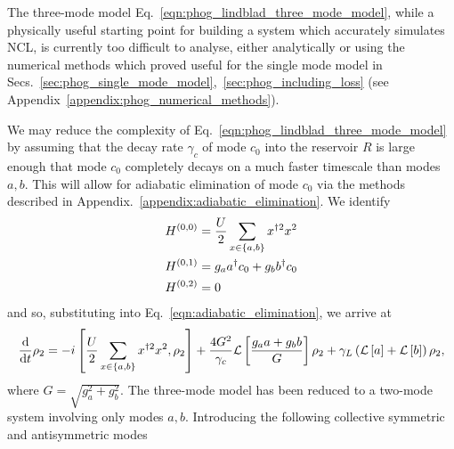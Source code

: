 The three-mode model Eq.~\ref{eqn:phog_lindblad_three_mode_model}, while a physically useful starting point for building a system which accurately simulates NCL, is currently too difficult to analyse, either analytically or using the numerical methods which proved useful for the single mode model in Secs.~\ref{sec:phog_single_mode_model},~\ref{sec:phog_including_loss} (see Appendix~\ref{appendix:phog_numerical_methods}). 

We may reduce the complexity of Eq.~\ref{eqn:phog_lindblad_three_mode_model} by assuming that the decay rate $\gamma_c$ of mode $c_0$ into the reservoir $R$ is large enough that mode $c_0$ completely decays on a much faster timescale than modes $a, b$. This will allow for adiabatic elimination of mode $c_0$ via the methods described in Appendix.~\ref{appendix:adiabatic_elimination}. We identify
\begin{align}
&H^{\left(0, 0\right)} = \frac{U}{2} \sum_{x \in \left\{a, b\right\}} x^{\dagger 2} x^2 \notag \\
%
&H^{\left(0, 1\right)} = g_a a^\dagger c_0 + g_b b^\dagger c_0 \notag \\
%
&H^{\left(0, 2\right)} = 0
\end{align}
and so, substituting into Eq.~\ref{eqn:adiabatic_elimination}, we arrive at
\begin{equation}\label{eqn:phog_two_mode_model_deriv}
\frac{\mathrm{d}}{\mathrm{d}t} \rho_2 = - i \left[\frac{U}{2} \sum_{x \in \left\{a, b\right\}} x^{\dagger 2} x^2, \rho_2\right] + \frac{4 G^2}{\gamma_c} \mathcal{L}\left[\frac{g_a a + g_b b}{G} \right]\rho_2 + \gamma_L \left(\mathcal{L}\left[a\right] + \mathcal{L}\left[b\right]\right)\rho_2,
\end{equation}
where $G = \sqrt{g_a^2 + g_b^2}$. The three-mode model has been reduced to a two-mode system involving only modes $a, b$. Introducing the following collective symmetric and antisymmetric modes

